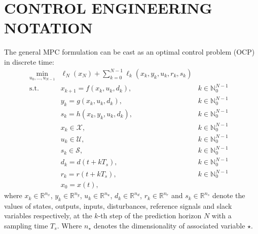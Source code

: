 \documentclass[10pt]{extarticle}
\begin{document}
\section{CONTROL ENGINEERING NOTATION}\label{sec:control_notation}

The general MPC formulation can be cast as an optimal control problem (OCP) in discrete time:
\begin{subequations}
	\label{eq:mpc_general_formal}
	\begin{align}
	\min_{u_0, \ldots, u_{N-1}} & \ell_N(x_N) + \sum_{k=0}^{N-1} \ell_k(x_k, y_k, u_k, r_k, s_k) &
	\label{eq:mpc_general_formal:cost}\\
	\text{s.t.} \ & x_{k+1} = f(x_k, u_k, d_k),  & k \in \mathbb{N}_{0}^{N-1} & \label{eq:mpc_general_formal:xp} \\
	& y_{k} = g(x_k, u_k, d_k),  & k \in \mathbb{N}_{0}^{N-1} & \label{eq:mpc_general_formal:yp} \\
	& s_{k} = h(x_k, y_k, u_k, d_k),  & k \in \mathbb{N}_{0}^{N-1} & \label{eq:mpc_general_formal:s} \\
	&  x_{k} \in \mathcal{X},  & k \in \mathbb{N}_{0}^{N-1}   \label{eq:mpc_general_formal:xb}\\
	& u_{k} \in \mathcal{U}, & k \in \mathbb{N}_{0}^{N-1} 
	\label{eq:mpc_general_formal:ub}\\
	& s_{k} \in \mathcal{S}, & k \in \mathbb{N}_{0}^{N-1} 
	\label{eq:mpc_general_formal:sb}\\
    & d_k = d(t + k T_s),  & k \in \mathbb{N}_{0}^{N-1} \label{eq:mpc_general_formal:d0} \\
    & r_k = r(t + k T_s),  & k \in \mathbb{N}_{0}^{N-1} \label{eq:mpc_general_formal:r0} \\
	& x_0 = x(t),\label{eq:mpc_general_formal:x0} 
	\end{align}
\end{subequations}
where $x_k \in \mathbb{R}^{n_x}$, $y_k \in \mathbb{R}^{n_y}$, $u_k \in \mathbb{R}^{n_u}$, $d_k \in \mathbb{R}^{n_d}$, $r_k \in \mathbb{R}^{n_r}$ and $s_k \in \mathbb{R}^{n_s}$ denote the values of states, outputs,
inputs, disturbances, reference signals and slack variables respectively, at the $k$-th step of the prediction horizon $N$ with a sampling time $T_s$. 
Where $n_{\star}$ denotes the dimensionality of associated variable $\star$.
\end{document}
